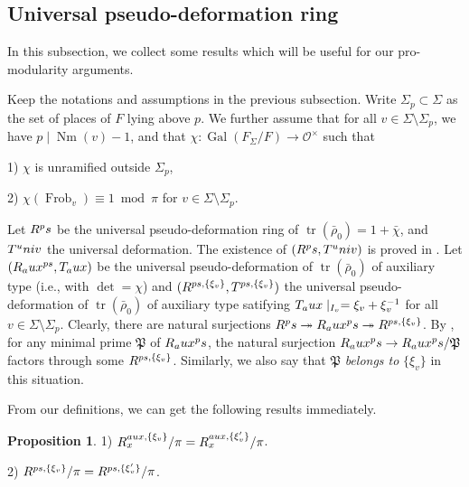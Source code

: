 \documentclass[12pt]{amsart}
\theoremstyle{plain}
\theoremstyle{definition}
\newtheorem{prop}[thm]{Proposition}
\theoremstyle{remark}
\begin{document}
 
 \subsection{Universal pseudo-deformation ring} \label{mis} In this subsection, we collect some results which will be useful for our pro-modularity arguments.
 
 Keep the notations and assumptions in the previous subsection. Write $\Sigma_p \subset \Sigma$ as the set of places of $F$ lying above $p$. We further assume that for all $v \in \Sigma \setminus \Sigma_p$, we have $p \mid \operatorname{Nm}(v)-1$, and that $\chi: \operatorname{Gal}(F_{\Sigma}/F) \to \mathcal{O}^{\times}$ such that 
 
 1) $\chi$ is unramified outside $ \Sigma_p$,
 
 2) $\chi(\operatorname{Frob}_v) \equiv 1~\operatorname{mod}~\pi$ for  
 $v \in \Sigma \setminus \Sigma_p$.
 
Let $R^\textnormal{ps}$ be the universal pseudo-deformation ring of $\operatorname{tr}(\bar{\rho}_0)= 1+\bar{\chi}$, and $T^\textnormal{univ}$ the universal deformation. The existence of $(R^\textnormal{ps}, T^\textnormal{univ})$ is proved in \cite[Section 2.4]{skinner1999residually}.  Let $ (R_\textnormal{aux}^{\textnormal{ps}}, T_\textnormal{aux}) $ be the universal pseudo-deformation of $\operatorname{tr}(\bar{\rho}_0)$ of auxiliary type (i.e., with $ \operatorname{det} = \chi $)  and $(R^{\textnormal{ps}, \{\xi_v\}}, T^{\textnormal{ps}, \{\xi_v\}})$ the universal pseudo-deformation of $\operatorname{tr}(\bar{\rho}_0)$ of auxiliary type satifying $T_\textnormal{aux}\mid_{I_v}= \xi_v+\xi_v^{-1} $ for all $v \in \Sigma \setminus \Sigma_p$. Clearly, there are natural surjections $R^\textnormal{ps} \twoheadrightarrow R_\textnormal{aux}^\textnormal{ps} \twoheadrightarrow R^{\textnormal{ps}, \{\xi_v\}}$. By \cite[Corollary 5.7.2]{pan2022fontaine}, for any minimal prime $\mathfrak{P}$ of $R_\textnormal{aux}^\textnormal{ps}$, the natural surjection $ R_\textnormal{aux}^\textnormal{ps} \to R_\textnormal{aux}^\textnormal{ps}/ \mathfrak{P}$ factors through some $ R^{\textnormal{ps}, \{\xi_v\}}$. Similarly, we also say that $ \mathfrak{P}$ \textit{belongs to} $\{\xi_v\}$ in this situation.

From our definitions, we can get the following results immediately.

\begin{prop}\label{RX1}
	1) $R_x^{\textnormal{aux}, \{\xi_v\}}/\pi=R_x^{\textnormal{aux}, \{\xi'_v\}}/\pi$.
	
	2) $R^{\textnormal{ps}, \{\xi_v\}}/\pi= R^{\textnormal{ps}, \{\xi'_v\}}/\pi$. 
\end{prop}
\end{document}
